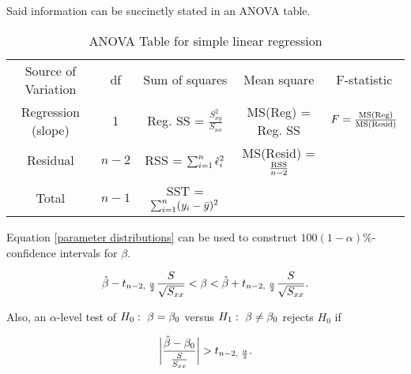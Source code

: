 \documentclass{homework}
\begin{document}
Said information can be succinctly stated in an ANOVA table.

\begin{table}
    \centering
    \caption{ANOVA Table for simple linear regression}
    \begin{tabular}{*5c}
        \toprule
        Source of Variation & df  & Sum of squares & Mean square & F-statistic \\    
        Regression (slope) & 1 & Reg. SS = $\frac{S_{xy}^2}{S_{xx}}$     & MS(Reg) = Reg. SS & $F = \frac{\textnormal {MS(Reg)}}{\textnormal {MS(Resid)}}$ \\
        Residual & $n-2$ & RSS = $\sum_{i=1}^{n} \hat{\epsilon}_i^2$ & MS(Resid) = $\frac{\textnormal{RSS}}{n-2}$  \\
        \hline
        Total & $n-1$ & SST = $\sum_{i=1}^{n} (y_i - \bar{y})^2$ & & \\
        \midrule
        \bottomrule
    \end{tabular}
\end{table}

Equation \eqref{parameter distributions} can be used to construct $100(1-\alpha)\%$-confidence intervals for $\beta$.

\begin{equation}
    \hat{\beta} - t_{n-2, \textnormal{ } \frac{\alpha}{2}} \frac{S}{\sqrt{S_{xx}}}< \beta <\hat{\beta} + t_{n-2, \textnormal{ } \frac{\alpha}{2}} \frac{S}{\sqrt{S_{xx}}}.
\end{equation}

Also, an $\alpha$-level test of $H_0: \textnormal{ } \beta = \beta_0$ versus $H_1: \textnormal{ } \beta \neq \beta_0$ rejects $H_0$ if 

\begin{equation}
    \bigg|\frac{\hat{\beta} - \beta_0}{\frac{S}{S_{xx}}}\bigg| > t_{n-2, \textnormal{ } \frac{\alpha}{2}}.
\end{equation}
\end{document}
